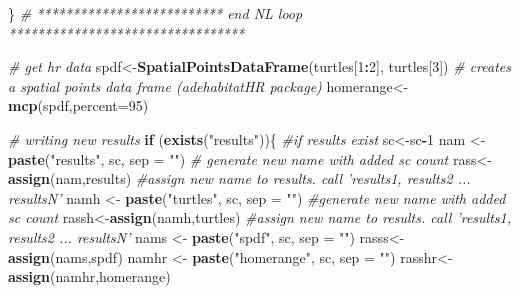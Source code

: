 \documentclass[]{article}
\newenvironment{Shaded}{\begin{snugshade}}{\end{snugshade}}
\newcommand{\KeywordTok}[1]{\textcolor[rgb]{0.13,0.29,0.53}{\textbf{#1}}}
\newcommand{\DataTypeTok}[1]{\textcolor[rgb]{0.13,0.29,0.53}{#1}}
\newcommand{\DecValTok}[1]{\textcolor[rgb]{0.00,0.00,0.81}{#1}}
\newcommand{\StringTok}[1]{\textcolor[rgb]{0.31,0.60,0.02}{#1}}
\newcommand{\CommentTok}[1]{\textcolor[rgb]{0.56,0.35,0.01}{\textit{#1}}}
\newcommand{\ControlFlowTok}[1]{\textcolor[rgb]{0.13,0.29,0.53}{\textbf{#1}}}
\newcommand{\OperatorTok}[1]{\textcolor[rgb]{0.81,0.36,0.00}{\textbf{#1}}}
\newcommand{\NormalTok}[1]{#1}
\begin{document}
\begin{Shaded}
\begin{Highlighting}[]
\NormalTok{\} }\CommentTok{# ************************** end NL loop *********************************}

\CommentTok{# get hr data}
\NormalTok{spdf<-}\KeywordTok{SpatialPointsDataFrame}\NormalTok{(turtles[}\DecValTok{1}\OperatorTok{:}\DecValTok{2}\NormalTok{], turtles[}\DecValTok{3}\NormalTok{]) }\CommentTok{# creates a spatial points data frame (adehabitatHR package)}
\NormalTok{homerange<-}\KeywordTok{mcp}\NormalTok{(spdf,}\DataTypeTok{percent=}\DecValTok{95}\NormalTok{)}

\CommentTok{# writing new results}
\ControlFlowTok{if}\NormalTok{ (}\KeywordTok{exists}\NormalTok{(}\StringTok{"results"}\NormalTok{))\{  }\CommentTok{#if results exist}
\NormalTok{    sc<-sc}\OperatorTok{-}\DecValTok{1} 
\NormalTok{    nam <-}\StringTok{ }\KeywordTok{paste}\NormalTok{(}\StringTok{"results"}\NormalTok{, sc, }\DataTypeTok{sep =} \StringTok{""}\NormalTok{) }\CommentTok{# generate new name with added sc count}
\NormalTok{    rass<-}\KeywordTok{assign}\NormalTok{(nam,results) }\CommentTok{#assign new name to results. call 'results1, results2 ... resultsN'}
\NormalTok{    namh <-}\StringTok{ }\KeywordTok{paste}\NormalTok{(}\StringTok{"turtles"}\NormalTok{, sc, }\DataTypeTok{sep =} \StringTok{""}\NormalTok{)  }\CommentTok{#generate new name with added sc count}
\NormalTok{    rassh<-}\KeywordTok{assign}\NormalTok{(namh,turtles) }\CommentTok{#assign new name to results. call 'results1, results2 ... resultsN'}
\NormalTok{    nams <-}\StringTok{ }\KeywordTok{paste}\NormalTok{(}\StringTok{"spdf"}\NormalTok{, sc, }\DataTypeTok{sep =} \StringTok{""}\NormalTok{) }
\NormalTok{    rasss<-}\KeywordTok{assign}\NormalTok{(nams,spdf) }
\NormalTok{    namhr <-}\StringTok{ }\KeywordTok{paste}\NormalTok{(}\StringTok{"homerange"}\NormalTok{, sc, }\DataTypeTok{sep =} \StringTok{""}\NormalTok{)  }
\NormalTok{    rasshr<-}\KeywordTok{assign}\NormalTok{(namhr,homerange) }


\end{Highlighting}
\end{Shaded}
\end{document}
